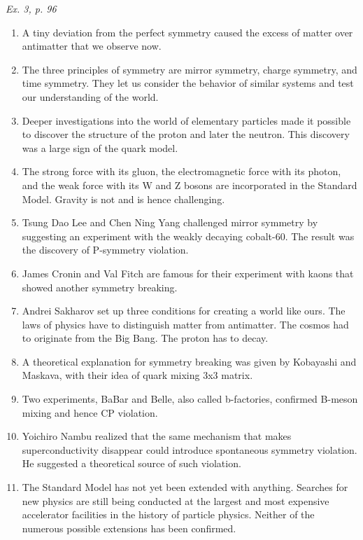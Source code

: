 \documentclass[a4paper, 12pt]{article}
\def\task#1{\begin{center}\it #1\end{center}}
\begin{document}
\task{Ex. 3, p. 96}
\begin{enumerate}[label=\alph*)]
	\item A tiny deviation from the perfect symmetry caused the excess of 
		matter over antimatter that we observe now.

	\item The three principles of symmetry are mirror symmetry, charge 
		symmetry, and time symmetry. They let us consider the behavior of 
		similar systems and test our understanding of the world.

	\item Deeper investigations into the world of elementary particles 
		made it possible to discover the structure of the proton and later 
		the neutron. This discovery was a large sign of the quark model.

	\item The strong force with its gluon, the electromagnetic force with 
		its photon, and the weak force with its W and Z bosons are 
		incorporated in the Standard Model. Gravity is not and is hence 
		challenging.

	\item Tsung Dao Lee and Chen Ning Yang challenged mirror symmetry by 
		suggesting an experiment with the weakly decaying cobalt-60. The 
		result was the discovery of P-symmetry violation.

	\item James Cronin and Val Fitch are famous for their experiment with 
		kaons that showed another symmetry breaking.

	\item Andrei Sakharov set up three conditions for creating a world 
		like ours. The laws of physics have to distinguish matter from 
		antimatter. The cosmos had to originate from the Big Bang. The 
		proton has to decay.

	\item A theoretical explanation for symmetry breaking was given by 
		Kobayashi and Maskava, with their idea of quark mixing 3x3 matrix.

	\item Two experiments, BaBar and Belle, also called b-factories, 
		confirmed B-meson mixing and hence CP violation.

	\item Yoichiro Nambu realized that the same mechanism that makes 
		superconductivity disappear could introduce spontaneous symmetry 
		violation. He suggested a theoretical source of such violation.

	\item The Standard Model has not yet been extended with anything. 
		Searches for new physics are still being conducted at the largest 
		and most expensive accelerator facilities in the history of 
		particle physics. Neither of the numerous possible extensions has 
		been confirmed.
\end{enumerate}
\end{document}
